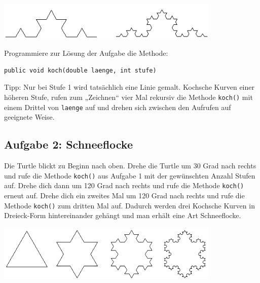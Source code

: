 \vspace{5mm}

\begin{minipage}[b]{1.0\textwidth}
  \centering
  \includegraphics[width=0.8\textwidth]{./inf/SEKII/06_Java_Rekursion/Aufgabe3_1-34.png}
\end{minipage}

\vspace{5mm}

Programmiere zur Lösung der Aufgabe die Methode:

\begin{lstlisting}
public void koch(double laenge, int stufe)
\end{lstlisting}

Tipp: Nur bei Stufe 1 wird tatsächlich eine Linie gemalt. Kochsche Kurven einer
höheren Stufe, rufen zum „Zeichnen“ vier Mal rekursiv die Methode
\lstinline|koch()| mit einem Drittel von \lstinline|laenge| auf und drehen sich
zwischen den Aufrufen auf geeignete Weise.


\subsection{Aufgabe 2: Schneeflocke}

Die Turtle blickt zu Beginn nach oben. Drehe die Turtle um 30 Grad nach rechts
und rufe die Methode \lstinline|koch()| aus Aufgabe 1 mit der gewünschten
Anzahl Stufen auf. Drehe dich dann um 120 Grad nach rechts und rufe die Methode
\lstinline|koch()| erneut auf. Drehe dich ein zweites Mal um 120 Grad nach
rechts und rufe die Methode \lstinline|koch()| zum dritten Mal auf. Dadurch
werden drei Kochsche Kurven in Dreieck-Form hintereinander gehängt und man
erhält eine Art Schneeflocke.

\vspace{5mm}

\begin{minipage}[b]{1.0\textwidth}
  \centering
  \includegraphics[width=0.8\textwidth]{./inf/SEKII/06_Java_Rekursion/Aufgabe3_2.png}
\end{minipage}



